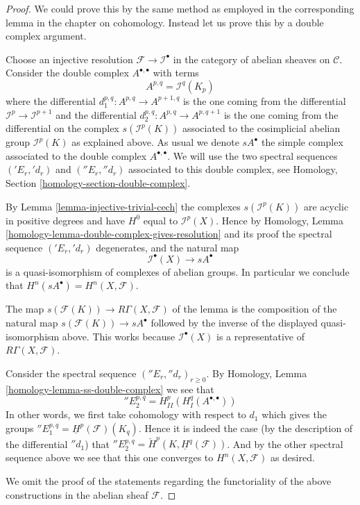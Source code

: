 \begin{proof}
We could prove this by the same method as employed in the corresponding
lemma in the chapter on cohomology. Instead let us prove this by a
double complex argument.

\medskip\noindent
Choose an injective resolution $\mathcal{F} \to \mathcal{I}^\bullet$
in the category of abelian sheaves on $\mathcal{C}$. Consider the
double complex $A^{\bullet, \bullet}$ with terms
$$
A^{p, q} = \mathcal{I}^q(K_p)
$$
where the differential $d_1^{p, q} : A^{p, q} \to A^{p + 1, q}$
is the one coming from the differential $\mathcal{I}^p \to \mathcal{I}^{p + 1}$
and the differential $d_2^{p, q} : A^{p, q} \to A^{p, q + 1}$ is the
one coming from the differential on the complex
$s(\mathcal{I}^p(K))$ associated to the cosimplicial abelian group
$\mathcal{I}^p(K)$ as explained above.
As usual we denote $sA^\bullet$ the simple complex associated to
the double complex $A^{\bullet, \bullet}$.
We will use the two spectral
sequences $({}'E_r, {}'d_r)$ and $({}''E_r, {}''d_r)$
associated to this double complex, see
Homology, Section \ref{homology-section-double-complex}.

\medskip\noindent
By Lemma \ref{lemma-injective-trivial-cech}
the complexes $s(\mathcal{I}^p(K))$ are acyclic in
positive degrees and have $H^0$ equal to $\mathcal{I}^p(X)$.
Hence by
Homology, Lemma \ref{homology-lemma-double-complex-gives-resolution}
and its proof the spectral sequence $({}'E_r, {}'d_r)$ degenerates,
and the natural map
$$
\mathcal{I}^\bullet(X) \longrightarrow sA^\bullet
$$
is a quasi-isomorphism of complexes of abelian groups. In particular
we conclude that $H^n(sA^\bullet) = H^n(X, \mathcal{F})$.

\medskip\noindent
The map $s(\mathcal{F}(K)) \longrightarrow R\Gamma(X, \mathcal{F})$ of
the lemma is the composition of the natural map
$s(\mathcal{F}(K)) \to sA^\bullet$ followed by the inverse
of the displayed quasi-isomorphism above. This works because
$\mathcal{I}^\bullet(X)$ is a representative of $R\Gamma(X, \mathcal{F})$.

\medskip\noindent
Consider the spectral sequence $({}''E_r, {}''d_r)_{r \geq 0}$. By
Homology, Lemma \ref{homology-lemma-ss-double-complex}
we see that
$$
{}''E_2^{p, q} = H^p_{II}(H^q_{I}(A^{\bullet, \bullet}))
$$
In other words, we first take cohomology with respect to
$d_1$ which gives the groups
${}''E_1^{p, q} = \underline{H}^p(\mathcal{F})(K_q)$.
Hence it is indeed the case (by the description of the differential
${}''d_1$) that
${}''E_2^{p, q} = \check{H}^p(K, \underline{H}^q(\mathcal{F}))$. 
And by the other spectral sequence above we see that this one
converges to $H^n(X, \mathcal{F})$ as desired.

\medskip\noindent
We omit the proof of the statements regarding the functoriality of
the above constructions in the abelian sheaf $\mathcal{F}$.
\end{proof}
